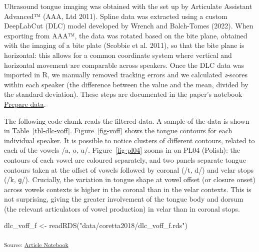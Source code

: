 \documentclass[
]{interact}
\newenvironment{Shaded}{\begin{snugshade}}{\end{snugshade}}
\newcommand{\FunctionTok}[1]{\textcolor[rgb]{0.28,0.35,0.67}{#1}}
\newcommand{\NormalTok}[1]{\textcolor[rgb]{0.00,0.23,0.31}{#1}}
\newcommand{\OtherTok}[1]{\textcolor[rgb]{0.00,0.23,0.31}{#1}}
\newcommand{\StringTok}[1]{\textcolor[rgb]{0.13,0.47,0.30}{#1}}
\begin{document}
Ultrasound tongue imaging was obtained with the set up by Articulate
Assistant Advanced™ (AAA, Ltd 2011). Spline data was extracted using a
custom DeepLabCut (DLC) model developed by Wrench and Balch-Tomes
(2022). When exporting from AAA™, the data was rotated based on the bite
plane, obtained with the imaging of a bite plate (Scobbie et al. 2011),
so that the bite plane is horizontal: this allows for a common
coordinate system where vertical and horizontal movement are comparable
across speakers. Once the DLC data was imported in R, we manually
removed tracking errors and we calculated \emph{z}-scores within each
speaker (the difference between the value and the mean, divided by the
standard deviation). These steps are documented in the paper's notebook
\href{notebooks/01_prepare_data.qmd}{Prepare data}.

The following code chunk reads the filtered data. A sample of the data
is shown in Table~\ref{tbl-dlc-voff}. Figure~\ref{fig-voff} shows the
tongue contours for each individual speaker. It is possible to notice
clusters of different contours, related to each of the vowels /a, o, u/.
Figure~\ref{fig-pl04} zooms in on PL04 (Polish): the contours of each
vowel are coloured separately, and two panels separate tongue contours
taken at the offset of vowels followed by coronal (/t, d/) and velar
stops (/k, ɡ/). Crucially, the variation in tongue shape at vowel offset
(or closure onset) across vowels contexts is higher in the coronal than
in the velar contexts. This is not surprising, giving the greater
involvement of the tongue body and dorsum (the relevant articulators of
vowel production) in velar than in coronal stops.

\begin{Shaded}
\begin{Highlighting}[]
\NormalTok{dlc\_voff\_f }\OtherTok{\textless{}{-}} \FunctionTok{readRDS}\NormalTok{(}\StringTok{"data/coretta2018/dlc\_voff\_f.rds"}\NormalTok{)}
\end{Highlighting}
\end{Shaded}

\textsubscript{Source:
\href{https://stefanocoretta.github.io/mv_uti/index.qmd.html}{Article
Notebook}}
\end{document}
